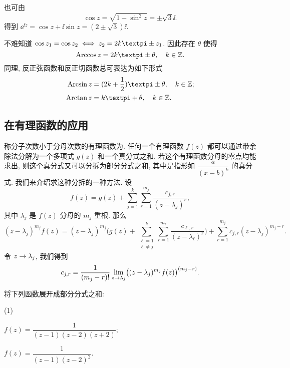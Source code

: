 也可由
\[
  \cos z=\sqrt{1-\sin^2 z}=\pm\sqrt 3\ii.
\]
得到 $\ee^{\ii z}=\cos z+\ii\sin z=(2\pm\sqrt 3)\ii$.

不难知道 $\cos z_1=\cos z_2\iff z_2=2k\cpi\pm z_1$.
因此存在 $\theta$ 使得
\[
  \Arccos z=2k\cpi\pm \theta,\quad k\in\BZ.
\]
同理, 反正弦函数和反正切函数总可表达为如下形式
\begin{align*}
  \Arcsin z&=(2k+\half)\cpi\pm \theta,\quad k\in\BZ;\\
  \Arctan z&=k\cpi+\theta,\quad k\in\BZ.
\end{align*}


\subsection{在有理函数的应用}
\label{ssec:application-of-derivative}

称分子次数小于分母次数的有理函数为.
任何一个有理函数 $f(z)$ 都可以通过带余除法分解为一个多项式 $g(z)$ 和一个真分式之和.
若这个有理函数分母的零点均能求出, 则这个真分式又可以分拆为部分分式之和, 其中是指形如 $\dfrac{a}{(x-b)^k}$ 的真分式.
我们来介绍求这种分拆的一种方法.
设
\[
  f(z)=g(z)+\sum_{j=1}^k \sum_{r=1}^{m_j} \frac{c_{j,r}}{(z-\lambda_j)^r},
\]
其中 $\lambda_j$ 是 $f(z)$ 分母的 $m_j$ 重根.
那么
\[
   (z-\lambda_j)^{m_j}f(z)
  =(z-\lambda_j)^{m_j}\biggl(g(z)+\sum_{\substack{\ell=1\\\ell\neq j}}^k \sum_{r=1}^{m_\ell} \frac{c_{\ell,r}}{(z-\lambda_\ell)^r}\biggr)
    +\sum_{r=1}^{m_j} c_{j,r}(z-\lambda_j)^{m_j-r}.
\]
令 $z\rightarrow \lambda_j$, 我们得到
\[
  c_{j,r}=\frac1{(m_j-r)!}\lim_{z\rightarrow \lambda_j}
  \bigl((z-\lambda_j)^{m_j}f(z)\bigr)^{(m_j-r)}.
\]

\begin{example}
  将下列函数展开成部分分式之和:\smallskip
  \begin{subexample}(1)
    \item $f(z)=\dfrac1{(z-1)(z-2)(z+2)}$;\smallskip
    \item $f(z)=\dfrac{1}{(z-1)(z-2)^2}$.
  \end{subexample}
\end{example}

